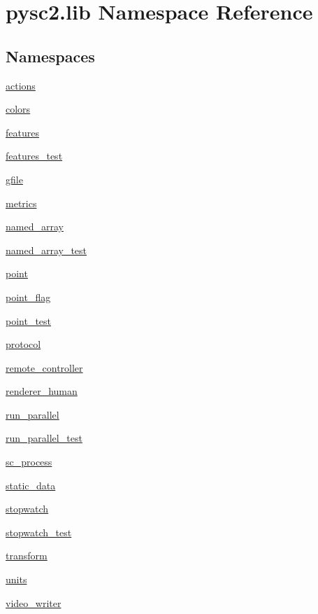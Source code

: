 \hypertarget{namespacepysc2_1_1lib}{}\section{pysc2.\+lib Namespace Reference}
\label{namespacepysc2_1_1lib}
\subsection*{Namespaces}
\begin{DoxyCompactItemize}
\item 
 \mbox{\hyperlink{namespacepysc2_1_1lib_1_1actions}{actions}}
\item 
 \mbox{\hyperlink{namespacepysc2_1_1lib_1_1colors}{colors}}
\item 
 \mbox{\hyperlink{namespacepysc2_1_1lib_1_1features}{features}}
\item 
 \mbox{\hyperlink{namespacepysc2_1_1lib_1_1features__test}{features\+\_\+test}}
\item 
 \mbox{\hyperlink{namespacepysc2_1_1lib_1_1gfile}{gfile}}
\item 
 \mbox{\hyperlink{namespacepysc2_1_1lib_1_1metrics}{metrics}}
\item 
 \mbox{\hyperlink{namespacepysc2_1_1lib_1_1named__array}{named\+\_\+array}}
\item 
 \mbox{\hyperlink{namespacepysc2_1_1lib_1_1named__array__test}{named\+\_\+array\+\_\+test}}
\item 
 \mbox{\hyperlink{namespacepysc2_1_1lib_1_1point}{point}}
\item 
 \mbox{\hyperlink{namespacepysc2_1_1lib_1_1point__flag}{point\+\_\+flag}}
\item 
 \mbox{\hyperlink{namespacepysc2_1_1lib_1_1point__test}{point\+\_\+test}}
\item 
 \mbox{\hyperlink{namespacepysc2_1_1lib_1_1protocol}{protocol}}
\item 
 \mbox{\hyperlink{namespacepysc2_1_1lib_1_1remote__controller}{remote\+\_\+controller}}
\item 
 \mbox{\hyperlink{namespacepysc2_1_1lib_1_1renderer__human}{renderer\+\_\+human}}
\item 
 \mbox{\hyperlink{namespacepysc2_1_1lib_1_1run__parallel}{run\+\_\+parallel}}
\item 
 \mbox{\hyperlink{namespacepysc2_1_1lib_1_1run__parallel__test}{run\+\_\+parallel\+\_\+test}}
\item 
 \mbox{\hyperlink{namespacepysc2_1_1lib_1_1sc__process}{sc\+\_\+process}}
\item 
 \mbox{\hyperlink{namespacepysc2_1_1lib_1_1static__data}{static\+\_\+data}}
\item 
 \mbox{\hyperlink{namespacepysc2_1_1lib_1_1stopwatch}{stopwatch}}
\item 
 \mbox{\hyperlink{namespacepysc2_1_1lib_1_1stopwatch__test}{stopwatch\+\_\+test}}
\item 
 \mbox{\hyperlink{namespacepysc2_1_1lib_1_1transform}{transform}}
\item 
 \mbox{\hyperlink{namespacepysc2_1_1lib_1_1units}{units}}
\item 
 \mbox{\hyperlink{namespacepysc2_1_1lib_1_1video__writer}{video\+\_\+writer}}
\end{DoxyCompactItemize}
